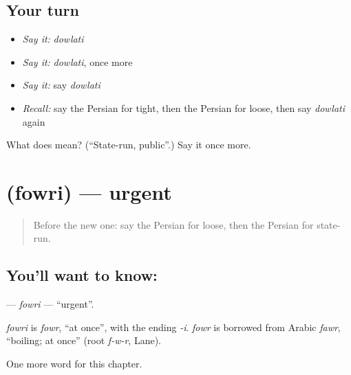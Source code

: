 \subsection*{Your turn}
\begin{itemize}
\raggedright
  \item \emph{Say it:} \emph{dowlati}
  \item \emph{Say it:} \emph{dowlati}, once more
  \item \emph{Say it:} say \emph{dowlati}
  \item \emph{Recall:} say the Persian for tight, then the Persian for loose, then say \emph{dowlati} again
\end{itemize}

\begin{tcolorbox}[breakable,colback=teal!4,colframe=teal!35!black,title={Before you move on}]
What does  mean? (\textquotedblleft{}State-run, public\textquotedblright{}.) Say it once more.
\end{tcolorbox}
\section[\texorpdfstring{\fa{فوری} (fowri)}{فوری (fowri)}]{ (fowri) — urgent}

\label{lesson:FA-C162-fowri}



\begin{quote}
Before the new one: say the Persian for loose, then the Persian for state-run.
\end{quote}

\subsection*{You'll want to know: }
\textbf{} — \emph{fowri} — \textquotedblleft{}urgent\textquotedblright{}.

\begin{cousinweb}
\emph{fowri} is \emph{fowr}, \textquotedblleft{}at once\textquotedblright{}, with the ending \emph{-i}. \emph{fowr} is borrowed from Arabic \emph{fawr}, \textquotedblleft{}boiling; at once\textquotedblright{} (root \emph{f-w-r}, Lane).
\end{cousinweb}

\begin{grammarlens}[title={What you've built}]
One more word for this chapter.
\end{grammarlens}

